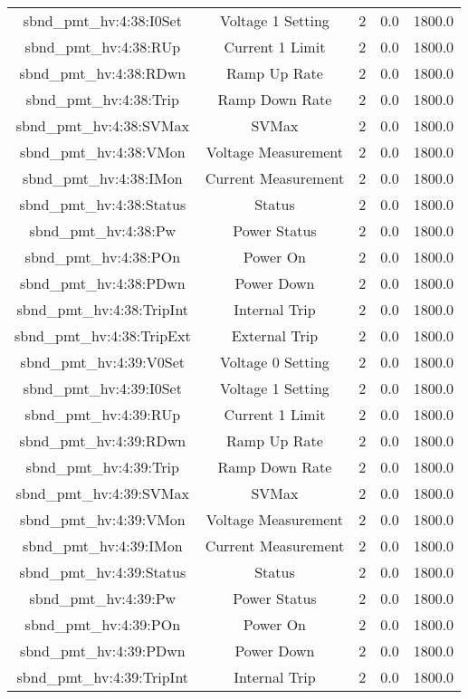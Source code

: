 \begin{table}[ptb]
\begin{tabular}{c | c c c c}
sbnd_pmt_hv:4:38:I0Set & Voltage 1 Setting & 2 & 0.0 & 1800.0\\ 
sbnd_pmt_hv:4:38:RUp & Current 1 Limit & 2 & 0.0 & 1800.0\\ 
sbnd_pmt_hv:4:38:RDwn & Ramp Up Rate & 2 & 0.0 & 1800.0\\ 
sbnd_pmt_hv:4:38:Trip & Ramp Down Rate & 2 & 0.0 & 1800.0\\ 
sbnd_pmt_hv:4:38:SVMax & SVMax & 2 & 0.0 & 1800.0\\ 
sbnd_pmt_hv:4:38:VMon & Voltage Measurement & 2 & 0.0 & 1800.0\\ 
sbnd_pmt_hv:4:38:IMon & Current Measurement & 2 & 0.0 & 1800.0\\ 
sbnd_pmt_hv:4:38:Status & Status & 2 & 0.0 & 1800.0\\ 
sbnd_pmt_hv:4:38:Pw & Power Status & 2 & 0.0 & 1800.0\\ 
sbnd_pmt_hv:4:38:POn & Power On & 2 & 0.0 & 1800.0\\ 
sbnd_pmt_hv:4:38:PDwn & Power Down & 2 & 0.0 & 1800.0\\ 
sbnd_pmt_hv:4:38:TripInt & Internal Trip & 2 & 0.0 & 1800.0\\ 
sbnd_pmt_hv:4:38:TripExt & External Trip & 2 & 0.0 & 1800.0\\ 
sbnd_pmt_hv:4:39:V0Set & Voltage 0 Setting & 2 & 0.0 & 1800.0\\ 
sbnd_pmt_hv:4:39:I0Set & Voltage 1 Setting & 2 & 0.0 & 1800.0\\ 
sbnd_pmt_hv:4:39:RUp & Current 1 Limit & 2 & 0.0 & 1800.0\\ 
sbnd_pmt_hv:4:39:RDwn & Ramp Up Rate & 2 & 0.0 & 1800.0\\ 
sbnd_pmt_hv:4:39:Trip & Ramp Down Rate & 2 & 0.0 & 1800.0\\ 
sbnd_pmt_hv:4:39:SVMax & SVMax & 2 & 0.0 & 1800.0\\ 
sbnd_pmt_hv:4:39:VMon & Voltage Measurement & 2 & 0.0 & 1800.0\\ 
sbnd_pmt_hv:4:39:IMon & Current Measurement & 2 & 0.0 & 1800.0\\ 
sbnd_pmt_hv:4:39:Status & Status & 2 & 0.0 & 1800.0\\ 
sbnd_pmt_hv:4:39:Pw & Power Status & 2 & 0.0 & 1800.0\\ 
sbnd_pmt_hv:4:39:POn & Power On & 2 & 0.0 & 1800.0\\ 
sbnd_pmt_hv:4:39:PDwn & Power Down & 2 & 0.0 & 1800.0\\ 
sbnd_pmt_hv:4:39:TripInt & Internal Trip & 2 & 0.0 & 1800.0\\ 

\end{tabular}
\end{table}
